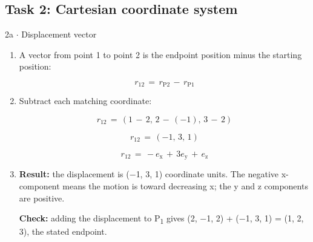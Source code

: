 \documentclass[11pt]{article}
\begin{document}
\begin{keepsection}\subsection{Task 2: Cartesian coordinate system}

\begin{workedbox}{2a \ensuremath{\cdot} Displacement vector}
\begin{enumerate}
\item {}
A vector from point 1 to point 2 is the endpoint position minus the starting position:

\begin{equation*}{r}_{12}\, =\, {r}_{\mathrm{P}2}\, -\, {r}_{\mathrm{P}1}\end{equation*}
\item {}
Subtract each matching coordinate:

\begin{equation*}{r}_{12}\, =\, (1\, -\, 2,\, 2\, -\, (-1),\, 3\, -\, 2)\end{equation*}

\begin{equation*}{r}_{12}\, =\, (-1,\, 3,\, 1)\end{equation*}

\begin{equation*}{r}_{12}\, =\, -{e}_{\mathrm{x}}\, +\, 3{e}_{\mathrm{y}}\, +\, {e}_{\mathrm{z}}\end{equation*}
\item {}
\textbf{Result:} the displacement is (\ensuremath{-}1, 3, 1) coordinate units. The negative x-component means the motion is toward decreasing x; the y and z components are positive.

\textbf{Check:} adding the displacement to P\textsubscript{1} gives (2, \ensuremath{-}1, 2) + (\ensuremath{-}1, 3, 1) = (1, 2, 3), the stated endpoint.
\end{enumerate}
\end{workedbox}

\end{keepsection}
\end{document}

